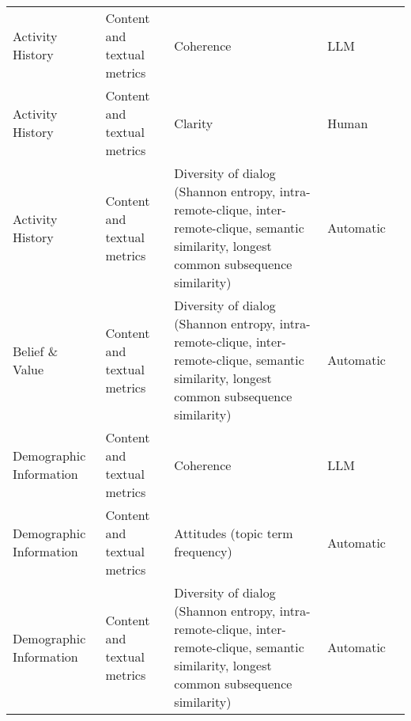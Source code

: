 \begin{small}
\begin{center}
\begin{longtable}{@{}p{}p{}p{}p{}p{}@{}}
Activity History        & Content and textual metrics         & Coherence                                                                                                                                   & LLM               & \cite{Li2024SchemaGuidedCC}                                                                                                                \\
Activity History        & Content and textual metrics         & Clarity                                                                                                                                     & Human             & \cite{10.1145/3613904.3642363}                                                                                                                \\
Activity History        & Content and textual metrics         & Diversity of dialog (Shannon entropy, intra-remote-clique, inter-remote-clique, semantic similarity, longest common subsequence similarity) & Automatic         & \cite{Ha2024CloChatUH}                                                                                                             \\
Belief \& Value        & Content and textual metrics         & Diversity of dialog (Shannon entropy, intra-remote-clique, inter-remote-clique, semantic similarity, longest common subsequence similarity) & Automatic         & \cite{gu2024agentgroupchatinteractivegroupchat}                                                                                                                              \\
Demographic Information & Content and textual metrics         & Coherence                                                                                                                                   & LLM               & \cite{Li2024SchemaGuidedCC}                                                                                                                 \\
Demographic Information & Content and textual metrics         & Attitudes (topic term frequency)                                                                                                            & Automatic         & \cite{fang2024llm}                                                                                                                               \\
Demographic Information & Content and textual metrics         & Diversity of dialog (Shannon entropy, intra-remote-clique, inter-remote-clique, semantic similarity, longest common subsequence similarity) & Automatic         & \cite{fang2024llm}                                                                                                                                 \\

\end{longtable}
\end{center}
\end{small}

